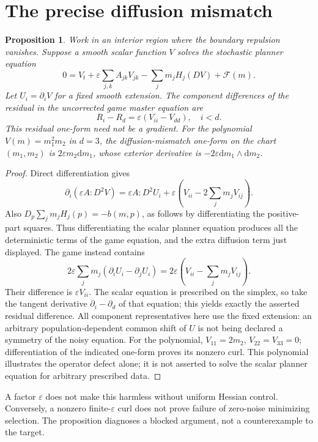 \documentclass[11pt]{article}
\newtheorem{proposition}[theorem]{Proposition}
\newcommand{\dd}{\mathrm d}
\begin{document}
\section{The precise diffusion mismatch}
\begin{proposition}\label{defect}
Work in an interior region where the boundary repulsion vanishes. Suppose a smooth scalar function $V$ solves the stochastic planner equation
\[
 0=V_t+\varepsilon\sum_{j,k}A_{jk}V_{jk}-\sum_jm_jH_j(DV)+\mathcal F(m).
\]
Let $U_i=\partial_iV$ for a fixed smooth extension. The component differences of the residual in the uncorrected game master equation are
\[
 R_i-R_d=\varepsilon(V_{ii}-V_{dd}),\quad i<d.
\]
This residual one-form need not be a gradient. For the polynomial $V(m)=m_1^2m_2$ in $d=3$, the diffusion-mismatch one-form on the chart $(m_1,m_2)$ is $2\varepsilon m_2\dd m_1$, whose exterior derivative is $-2\varepsilon\dd m_1\wedge\dd m_2$.
\end{proposition}
\begin{proof}
Direct differentiation gives
\[
 \partial_i\left(\varepsilon A:D^2V\right)
 =\varepsilon A:D^2U_i+
 \varepsilon\left(V_{ii}-2\sum_jm_jV_{ij}\right).
\]
Also $D_p\sum_jm_jH_j(p)=-b(m,p)$, as follows by differentiating the positive-part squares. Thus differentiating the scalar planner equation produces all the deterministic terms of the game equation, and the extra diffusion term just displayed. The game instead contains
\[
 2\varepsilon\sum_jm_j(\partial_iU_i-\partial_jU_i)
 =2\varepsilon\left(V_{ii}-\sum_jm_jV_{ij}\right).
\]
Their difference is $\varepsilon V_{ii}$. The scalar equation is prescribed on the simplex, so take the tangent derivative $\partial_i-\partial_d$ of that equation; this yields exactly the asserted residual difference. All component representatives here use the fixed extension: an arbitrary population-dependent common shift of $U$ is not being declared a symmetry of the noisy equation. For the polynomial, $V_{11}=2m_2$, $V_{22}=V_{33}=0$; differentiation of the indicated one-form proves its nonzero curl. This polynomial illustrates the operator defect alone; it is not asserted to solve the scalar planner equation for arbitrary prescribed data.
\end{proof}

A factor $\varepsilon$ does not make this harmless without uniform Hessian control. Conversely, a nonzero finite-$\varepsilon$ curl does not prove failure of zero-noise minimizing selection. The proposition diagnoses a blocked argument, not a counterexample to the target.
\end{document}
